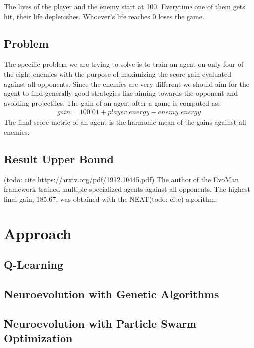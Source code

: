 \documentclass[conference]{IEEEtran}
\begin{document}
    The lives of the player and the enemy start at 100.
    Everytime one of them gets hit, their life deplenishes.
    Whoever's life reaches 0 loses the game.

    \subsection{Problem}\label{subsec:problem}
    The specific problem we are trying to solve is to train an agent on only four of the eight enemies with the purpose
    of maximizing the score gain evaluated against all opponents.
    Since the enemies are very different we should aim for the agent to find generally good strategies like
    aiming towards the opponent and avoiding projectiles.
    The gain of an agent after a game is computed as:
    \begin{gather*}
    gain = 100.01 + player\_energy - enemy\_energy
    \end{gather*}
    The final score metric of an agent is the harmonic mean of the gains against all enemies.

    \subsection{Result Upper Bound}\label{subsec:result-upper-bound}
    (todo: cite https://arxiv.org/pdf/1912.10445.pdf)
    The author of the EvoMan framework trained multiple specialized agents against all opponents.
    The highest final gain, 185.67, was obtained with the NEAT(todo: cite) algorithm.

    \section{Approach}\label{sec:approach}

    \subsection{Q-Learning}\label{subsec:q-learning}

    \subsection{Neuroevolution with Genetic Algorithms}\label{subsec:neuroevolution-with-genetic-algorithms}

    \subsection{Neuroevolution with Particle Swarm Optimization}\label{subsec:neuroevolution-with-particle-swarm-optimization}
\end{document}
